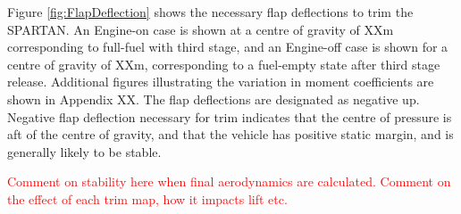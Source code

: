 		Figure \ref{fig:FlapDeflection} shows the necessary flap deflections to trim the SPARTAN. An Engine-on case is shown at a centre of gravity of  XXm corresponding to full-fuel with third stage, and an Engine-off case is shown for a centre of gravity of XXm, corresponding to a fuel-empty state after third stage release. Additional figures illustrating the variation in moment coefficients are shown in Appendix XX.
		The flap deflections are designated as negative up. Negative flap deflection necessary for trim indicates that the centre of pressure is aft of the centre of gravity, and that the vehicle has positive static margin, and is generally likely to be stable. 
		
		\textcolor{red}{Comment on stability here when final aerodynamics are calculated. Comment on the effect of each trim map, how it impacts lift etc.}
		
